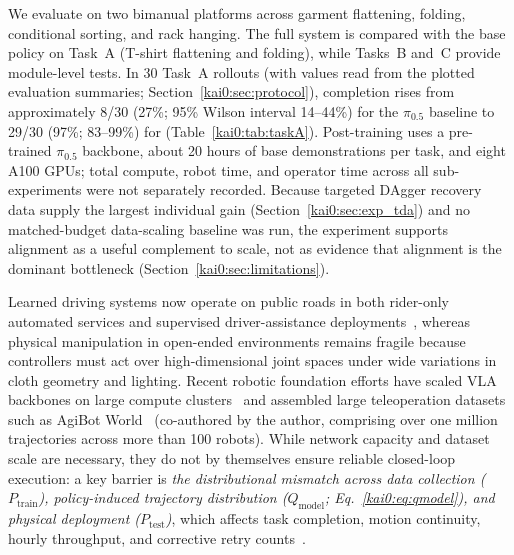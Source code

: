 We evaluate \chiz on two bimanual platforms across garment flattening, folding, conditional sorting, and rack hanging. The full system is compared with the base policy on Task~A (T-shirt flattening and folding), while Tasks~B and~C provide module-level tests. In 30 Task~A rollouts (with values read from the plotted evaluation summaries; Section~\ref{kai0:sec:protocol}), completion rises from approximately 8/30 (27\%; 95\% Wilson interval 14--44\%) for the $\pi_{0.5}$ baseline to 29/30 (97\%; 83--99\%) for \chiz (Table~\ref{kai0:tab:taskA}). Post-training uses a pre-trained $\pi_{0.5}$ backbone, about 20 hours of base demonstrations per task, and eight A100 GPUs; total compute, robot time, and operator time across all sub-experiments were not separately recorded. Because targeted DAgger recovery data supply the largest individual gain (Section~\ref{kai0:sec:exp_tda}) and no matched-budget data-scaling baseline was run, the experiment supports alignment as a useful complement to scale, not as evidence that alignment is the dominant bottleneck (Section~\ref{kai0:sec:limitations}).

Learned driving systems now operate on public roads in both rider-only automated services and supervised driver-assistance deployments~\cite{Kusano2025waymocrash,tesla2025fsd,waymo2025blog}, whereas physical manipulation in open-ended environments remains fragile because controllers must act over high-dimensional joint spaces under wide variations in cloth geometry and lighting. Recent robotic foundation efforts have scaled VLA backbones on large compute clusters~\cite{black2024pi0,sunday2025act1,black2025pi05,zheng2025xvla,amin2026pistar06,beingbeyond2026beingh05,generalist2025gen0} and assembled large teleoperation datasets such as AgiBot World~\cite{bu2025agibot_iros} (co-authored by the author, comprising over one million trajectories across more than 100 robots). While network capacity and dataset scale are necessary, they do not by themselves ensure reliable closed-loop execution: a key barrier is \emph{the distributional mismatch across data collection ($P_{\mathrm{train}}$), policy-induced trajectory distribution ($Q_{\mathrm{model}}$; Eq.~\eqref{kai0:eq:qmodel}), and physical deployment ($P_{\mathrm{test}}$)}, which affects task completion, motion continuity, hourly throughput, and corrective retry counts~\cite{chen2025benchmarking,shi2025diversity,bu2025agibot_iros,jiang2025behavior,amin2026pistar06}.

